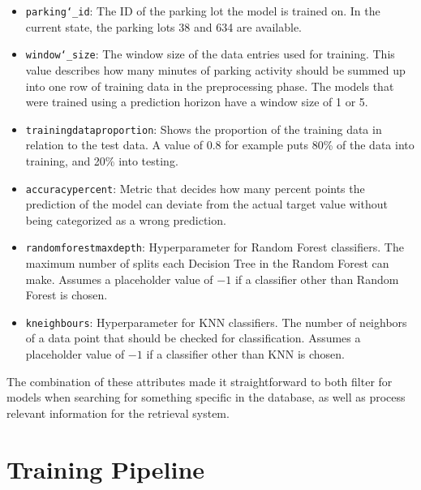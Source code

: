 \begin{itemize}
	\item \texttt{parking\char`_id}: The ID of the parking lot the model is trained on. In the current state, the parking lots 38 and 634 are available.
\item \texttt{window\char`_size}: The window size of the data entries used for training. This value describes how many minutes of parking activity should be summed up into one row of training data in the preprocessing phase. The models that were trained using a prediction horizon have a window size of 1 or 5.  
\item \texttt{trainingdataproportion}: Shows the proportion of the training data in relation to the test data. A value of 0.8 for example puts 80\% of the data into training, and 20\% into testing. 
\item \texttt{accuracypercent}: Metric that decides how many percent points the prediction of the model can deviate from the actual target value without being categorized as a wrong prediction. 
\item \texttt{randomforestmaxdepth}: Hyperparameter for Random Forest classifiers. The maximum number of splits each Decision Tree in the Random Forest can make. Assumes a placeholder value of $-1$ if a classifier other than Random Forest is chosen.
\item \texttt{kneighbours}: Hyperparameter for KNN classifiers. The number of neighbors of a data point that should be checked for classification. Assumes a placeholder value of $-1$ if a classifier other than KNN is chosen.
\end{itemize}

The combination of these attributes made it straightforward to both filter for models when searching for something specific in the database, as well as process relevant information for the retrieval system.




\section{Training Pipeline}

